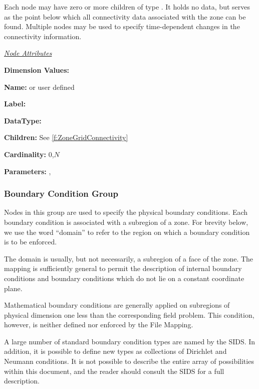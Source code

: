Each  node may have zero or more children of type
. It holds no data, but serves as the point
below which all connectivity data associated with the zone can be found.
Multiple  nodes may be used to specify
time-dependent changes in the connectivity information.

\textit{\uline{Node Attributes}}
\begin{Ventryic}{\textbf{Dimension Values:}}
\item [\textbf{Name:}]
       or user defined
\item [\textbf{Label:}]
\item [\textbf{DataType:}]
\item [\textbf{Children:}]
      See \autoref{f:ZoneGridConnectivity}
\item [\textbf{Cardinality:}]
      0,$N$
\item [\textbf{Parameters:}]
      , 
\end{Ventryic}

\subsubsection{Boundary Condition Group}

Nodes in this group are used to specify the physical boundary
conditions. Each boundary condition is associated with a subregion of
a zone. For brevity below, we use the word ``domain'' to refer to the
region on which a boundary condition is to be enforced.

The domain is usually, but not necessarily, a subregion of a face of the
zone. The mapping is sufficiently general to permit the description of
internal boundary conditions and boundary conditions which do not lie on
a constant coordinate plane.

Mathematical boundary conditions are generally applied on subregions of
physical dimension one less than the corresponding field problem. This
condition, however, is neither defined nor enforced by the File Mapping.

A large number of standard boundary condition types are named by the
SIDS. In addition, it is possible to define new types as collections
of Dirichlet and Neumann conditions. It is not possible to describe
the entire array of possibilities within this document, and the reader
should consult the SIDS for a full description.

